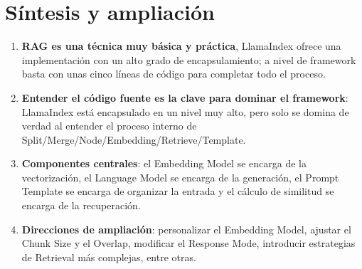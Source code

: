 \section{Síntesis y ampliación}

\begin{enumerate}
    \item \textbf{RAG es una técnica muy básica y práctica}, LlamaIndex ofrece una implementación con un alto grado de encapsulamiento; a nivel de framework basta con unas cinco líneas de código para completar todo el proceso.
    \item \textbf{Entender el código fuente es la clave para dominar el framework}: LlamaIndex está encapsulado en un nivel muy alto, pero solo se domina de verdad al entender el proceso interno de Split/Merge/Node/Embedding/Retrieve/Template.
    \item \textbf{Componentes centrales}: el Embedding Model se encarga de la vectorización, el Language Model se encarga de la generación, el Prompt Template se encarga de organizar la entrada y el cálculo de similitud se encarga de la recuperación.
    \item \textbf{Direcciones de ampliación}: personalizar el Embedding Model, ajustar el Chunk Size y el Overlap, modificar el Response Mode, introducir estrategias de Retrieval más complejas, entre otras.
\end{enumerate}


